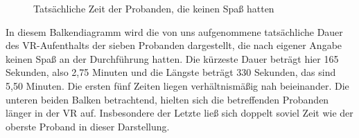 \documentclass{Paper}
\begin{document}
	\begin{figure}[H]
  \caption{Tatsächliche Zeit der Probanden, die keinen Spaß hatten}
  \label{ZeitKeinSpass}
	\end{figure}
In diesem Balkendiagramm wird die von uns aufgenommene tatsächliche Dauer des VR-Aufenthalts der sieben Probanden dargestellt, die nach eigener Angabe keinen Spaß an der Durchführung hatten. Die kürzeste Dauer beträgt hier 165 Sekunden, also 2,75 Minuten und die Längste beträgt 330 Sekunden, das sind 5,50 Minuten. Die ersten fünf Zeiten liegen verhältnismäßig nah beieinander. Die unteren beiden Balken betrachtend, hielten sich die betreffenden Probanden länger in der VR auf. Insbesondere der Letzte ließ sich doppelt soviel Zeit wie der oberste Proband in dieser Darstellung.	
\end{document}
